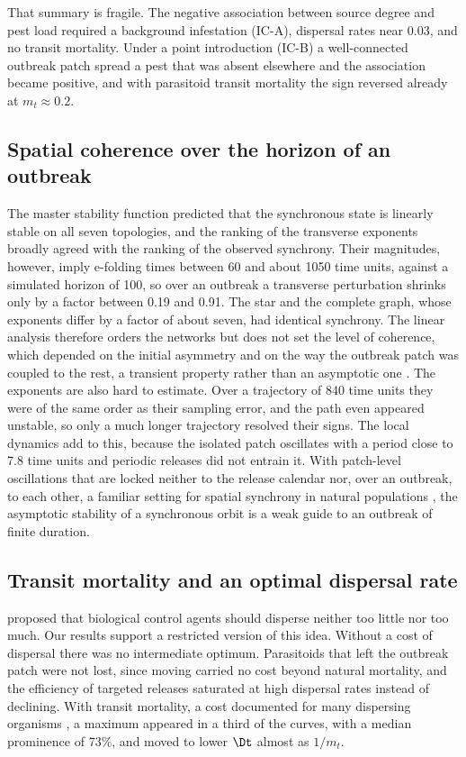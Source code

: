 That summary is fragile. The negative association between source degree and pest load required a background infestation (IC-A), dispersal rates near $0.03$, and no transit mortality. Under a point introduction (IC-B) a well-connected outbreak patch spread a pest that was absent elsewhere and the association became positive, and with parasitoid transit mortality the sign reversed already at $m_t \approx 0.2$.

\subsection*{Spatial coherence over the horizon of an outbreak}

The master stability function \citep{pecora1998,arenas2008} predicted that the synchronous state is linearly stable on all seven topologies, and the ranking of the transverse exponents broadly agreed with the ranking of the observed synchrony. Their magnitudes, however, imply e-folding times between 60 and about 1050 time units, against a simulated horizon of 100, so over an outbreak a transverse perturbation shrinks only by a factor between 0.19 and 0.91. The star and the complete graph, whose exponents differ by a factor of about seven, had identical synchrony. The linear analysis therefore orders the networks but does not set the level of coherence, which depended on the initial asymmetry and on the way the outbreak patch was coupled to the rest, a transient property rather than an asymptotic one \citep{hastings2018}. The exponents are also hard to estimate. Over a trajectory of 840 time units they were of the same order as their sampling error, and the path even appeared unstable, so only a much longer trajectory resolved their signs. The local dynamics add to this, because the isolated patch oscillates with a period close to 7.8 time units and periodic releases did not entrain it. With patch-level oscillations that are locked neither to the release calendar nor, over an outbreak, to each other, a familiar setting for spatial synchrony in natural populations \citep{liebhold2004}, the asymptotic stability of a synchronous orbit is a weak guide to an outbreak of finite duration.

\subsection*{Transit mortality and an optimal dispersal rate}

\citet{heimpel2011} proposed that biological control agents should disperse neither too little nor too much. Our results support a restricted version of this idea. Without a cost of dispersal there was no intermediate optimum. Parasitoids that left the outbreak patch were not lost, since moving carried no cost beyond natural mortality, and the efficiency of targeted releases saturated at high dispersal rates instead of declining. With transit mortality, a cost documented for many dispersing organisms \citep{bonte2012}, a maximum appeared in a third of the curves, with a median prominence of 73\%, and moved to lower $\Dt$ almost as $1/m_t$.

